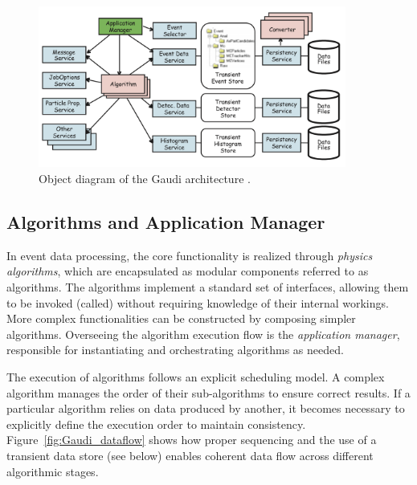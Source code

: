 \begin{figure}[htbp]
  \centering
  \includegraphics[width=0.9\textwidth]{figs/chapter3/Gaudi_object_diagram.png}
  \caption{Object diagram of the Gaudi architecture \cite{Gaudi}.}
  \label{fig:Gaudi_object_diagram}
\end{figure}

\subsection{Algorithms and Application Manager}
In event data processing, the core functionality is realized through \textit{physics algorithms}, which are encapsulated as modular components referred to as algorithms. The algorithms implement a standard set of interfaces, allowing them to be invoked (called) without requiring knowledge of their internal workings. More complex functionalities can be constructed by composing simpler algorithms. Overseeing the algorithm execution flow is the \textit{application manager}, responsible for instantiating and orchestrating algorithms as needed.

The execution of algorithms follows an explicit scheduling model. A complex algorithm manages the order of their sub-algorithms to ensure correct results. If a particular algorithm relies on data produced by another, it becomes necessary to explicitly define the execution order to maintain consistency. Figure~\ref{fig:Gaudi_dataflow} shows how proper sequencing and the use of a transient data store (see below) enables coherent data flow across different algorithmic stages.


